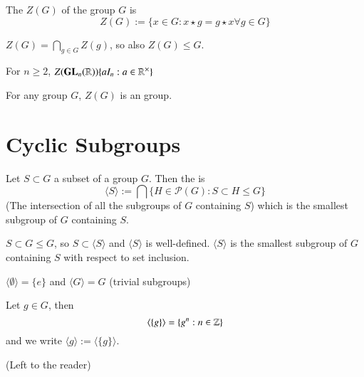 \documentclass[12pt, a4paper, twoside, openright, titlepage]{book}
\begin{document}
\begin{defn}{}{}
    The  $Z(G)$ of the group $G$ is \begin{equation}
        Z(G) := \{x \in G:x\star g = g \star x \forall g \in G\}
    \end{equation}
\end{defn}

\begin{prop}{}{}
    $Z(G) = \bigcap_{g \in G} Z(g)$, so also $Z(G) \leq G$.
\end{prop}

\begin{xca*}{}{}
    For $n \geq 2$, $Z(\mathbf{GL}_n(\mathbb R)) \{aI_n: a \in \mathbb R^{\times}\}$
\end{xca*}

\begin{rmk}{}{}
    For any group $G$, $Z(G)$ is an  group.
\end{rmk}


\section{\textsection Cyclic Subgroups}


\begin{defn}{}{}
    Let $S \subset G$ a subset of a group $G$. Then the  is \begin{equation}
        \langle S\rangle := \bigcap\{H \in \mathcal{P}(G): S \subset H \leq G\}
    \end{equation}
    (The intersection of all the subgroups of $G$ containing $S$) which is the smallest subgroup of $G$ containing $S$.
    \begin{note*}{}{}
        $S \subset G \leq G$, so $S \subset \langle S \rangle$ and $\langle S \rangle$ is well-defined. $\langle S \rangle$ is the smallest subgroup of $G$ containing $S$ with respect to set inclusion.
    \end{note*}
\end{defn}

\begin{eg}{}{}
    $\langle \emptyset\rangle = \{e\}$ and $\langle G \rangle = G$ (trivial subgroups)
\end{eg}

\begin{prop}{}{}
    Let $g \in G$, then \begin{equation}
        \langle \{g\}\rangle = \{g^n:n \in \mathbb Z\}
    \end{equation}
    and we write $\langle g \rangle := \langle \{g\}\rangle$.
    \begin{proof*}{}{}
        (Left to the reader)
    \end{proof*}
\end{prop}
\end{document}
